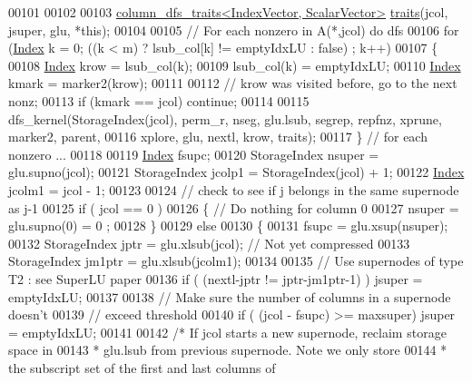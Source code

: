 \begin{DoxyCode}
00101   
00102   
00103   \hyperlink{struct_eigen_1_1internal_1_1column__dfs__traits}{column\_dfs\_traits<IndexVector, ScalarVector>} 
      \hyperlink{struct_eigen_1_1internal_1_1traits}{traits}(jcol, jsuper, glu, *\textcolor{keyword}{this});
00104   
00105   \textcolor{comment}{// For each nonzero in A(*,jcol) do dfs }
00106   \textcolor{keywordflow}{for} (\hyperlink{namespace_eigen_a62e77e0933482dafde8fe197d9a2cfde}{Index} k = 0; ((k < m) ? lsub\_col[k] != emptyIdxLU : \textcolor{keyword}{false}) ; k++)
00107   \{
00108     \hyperlink{namespace_eigen_a62e77e0933482dafde8fe197d9a2cfde}{Index} krow = lsub\_col(k); 
00109     lsub\_col(k) = emptyIdxLU; 
00110     \hyperlink{namespace_eigen_a62e77e0933482dafde8fe197d9a2cfde}{Index} kmark = marker2(krow); 
00111     
00112     \textcolor{comment}{// krow was visited before, go to the next nonz; }
00113     \textcolor{keywordflow}{if} (kmark == jcol) \textcolor{keywordflow}{continue};
00114     
00115     dfs\_kernel(StorageIndex(jcol), perm\_r, nseg, glu.lsub, segrep, repfnz, xprune, marker2, parent,
00116                    xplore, glu, nextl, krow, traits);
00117   \} \textcolor{comment}{// for each nonzero ... }
00118   
00119   \hyperlink{namespace_eigen_a62e77e0933482dafde8fe197d9a2cfde}{Index} fsupc;
00120   StorageIndex nsuper = glu.supno(jcol);
00121   StorageIndex jcolp1 = StorageIndex(jcol) + 1;
00122   \hyperlink{namespace_eigen_a62e77e0933482dafde8fe197d9a2cfde}{Index} jcolm1 = jcol - 1;
00123   
00124   \textcolor{comment}{// check to see if j belongs in the same supernode as j-1}
00125   \textcolor{keywordflow}{if} ( jcol == 0 )
00126   \{ \textcolor{comment}{// Do nothing for column 0 }
00127     nsuper = glu.supno(0) = 0 ;
00128   \}
00129   \textcolor{keywordflow}{else} 
00130   \{
00131     fsupc = glu.xsup(nsuper); 
00132     StorageIndex jptr = glu.xlsub(jcol); \textcolor{comment}{// Not yet compressed}
00133     StorageIndex jm1ptr = glu.xlsub(jcolm1); 
00134     
00135     \textcolor{comment}{// Use supernodes of type T2 : see SuperLU paper}
00136     \textcolor{keywordflow}{if} ( (nextl-jptr != jptr-jm1ptr-1) ) jsuper = emptyIdxLU;
00137     
00138     \textcolor{comment}{// Make sure the number of columns in a supernode doesn't}
00139     \textcolor{comment}{// exceed threshold}
00140     \textcolor{keywordflow}{if} ( (jcol - fsupc) >= maxsuper) jsuper = emptyIdxLU; 
00141     
00142     \textcolor{comment}{/* If jcol starts a new supernode, reclaim storage space in}
00143 \textcolor{comment}{     * glu.lsub from previous supernode. Note we only store }
00144 \textcolor{comment}{     * the subscript set of the first and last columns of }

\end{DoxyCode}
